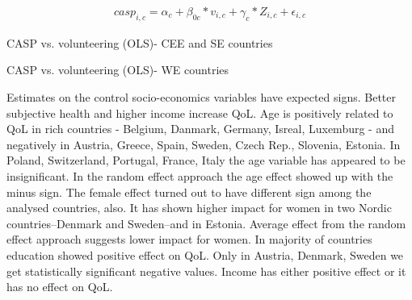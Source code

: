\documentclass[10pt, letterpaper]{article}
\begin{document}
\begin{spacing}{1.4}
  \begin{eqnarray}
	casp_{i,c}= \alpha_{c}+ \beta_{0c}*v_{i,c} + \gamma_{c}*Z_{i,c} + \epsilon_{i,c}
 \end{eqnarray}


\begin{spacing}{.9}
\begin{table}[H]
\centering 
\caption{CASP vs. volunteering (OLS)- CEE and SE countries}  
\begin{small} 
	 
      \label{pooling} 
\end{small}
\end{table}
\end{spacing}

\begin{spacing}{.9}
\begin{table}[H]
\centering 
\caption{CASP vs. volunteering (OLS)- WE countries}  
\begin{small} 
	 
      \label{pooling} 
\end{small}
\end{table}
\end{spacing}

Estimates on the control socio-economics variables have expected signs. Better subjective health and higher income increase QoL. Age is positively related to QoL in rich countries - Belgium, Danmark, Germany, Isreal, Luxemburg - and negatively in Austria, Greece, Spain, Sweden, Czech Rep.,  Slovenia, Estonia. In Poland, Switzerland, Portugal, France, Italy the age variable has appeared to be insignificant. In the random effect approach the age effect  showed up with the minus sign. The female effect turned out to have different sign among the analysed countries, also.  It has shown higher impact for women in two Nordic countries--Denmark and Sweden--and in Estonia. Average effect from the random effect approach suggests lower impact for women. In majority of countries education showed positive effect on QoL. Only in Austria, Denmark, Sweden we get statistically significant negative values. Income has either positive effect or it has no effect on QoL. \\ 


\end{spacing}
\end{document}

